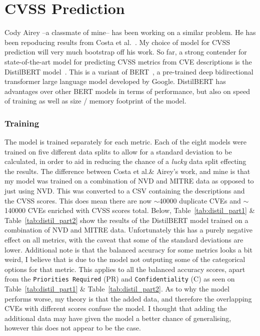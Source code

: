 \documentclass[12pt]{article}
\begin{document}
\section{CVSS Prediction}\label{cvss_prediction}

Cody Airey --a classmate of mine-- has been working on a similar problem. He has been repoducing
results from Costa et al.\@~\cite{costa}. My choice of model for CVSS prediction will very much
bootstrap off his work. So far, a strong contender for state-of-the-art model for predicting CVSS
metrics from CVE descriptions is the DistilBERT model~\cite{distilbert}. This is a variant of
BERT~\cite{BERT}, a pre-trained deep bidirectional transformer large language model developed by
Google. DistilBERT has advantages over other BERT models in terms of performance, but also on speed
of training as well as size / memory footprint of the model.

\subsubsection{Training}

The model is trained separately for each metric. Each of the eight models were trained on five
different data splits to allow for a standard deviation to be calculated, in order to aid in
reducing the chance of a \textit{lucky} data split effecting the results. The difference between
Costa et al.\@ \& Airey's work, and mine is that my model was trained on a combination of NVD and
MITRE data as opposed to just using NVD. This was converted to a CSV containing the descriptions and
the CVSS scores. This does mean there are now $\sim$40000 duplicate CVEs and $\sim$140000 CVEs
enriched with CVSS scores total. Below, Table~\ref{tab:distil_part1} \& Table~\ref{tab:distil_part2}
show the results of the DistilBERT model trained on a combination of NVD and MITRE data.
Unfortunately this has a purely negative effect on all metrics, with the caveat that some of the
standard deviations are lower. Additional note is that the balanced accuracy for some metrics looks
a bit weird, I believe that is due to the model not outputing some of the categorical options for
that metric. This applies to all the balanced accuracy scores, apart from the \texttt{Priorities
	Required} (PR) and \texttt{Confidentiality} (C) as seen on Table~\ref{tab:distil_part1} \&
Table~\ref{tab:distil_part2}. As to why the model performs worse, my theory is that the added data,
and therefore the overlapping CVEs with different scores confuse the model. I thought that adding
the additional data may have given the model a better chance of generalising, however this does not
appear to be the case.
\end{document}
